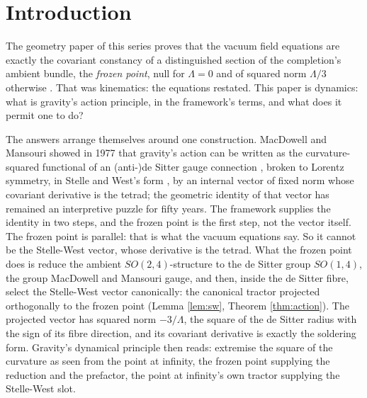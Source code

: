\documentclass[11pt]{article}
\theoremstyle{definition}
\begin{document}
\newpage
\section{Introduction}\label{sec:intro}

The geometry paper of this series proves that the vacuum field equations are exactly the covariant constancy of a distinguished section of the completion's ambient bundle, the \emph{frozen point}, null for $\Lambda = 0$ and of squared norm $\Lambda/3$ otherwise \cite{ButlerT6}. That was kinematics: the equations restated. This paper is dynamics: what is gravity's action principle, in the framework's terms, and what does it permit one to do?

The answers arrange themselves around one construction. MacDowell and Mansouri showed in 1977 that gravity's action can be written as the curvature-squared functional of an (anti-)de Sitter gauge connection \cite{MacDowellMansouri1977}, broken to Lorentz symmetry, in Stelle and West's form \cite{StelleWest1980}, by an internal vector of fixed norm whose covariant derivative is the tetrad; the geometric identity of that vector has remained an interpretive puzzle for fifty years. The framework supplies the identity in two steps, and the frozen point is the first step, not the vector itself. The frozen point is parallel: that is what the vacuum equations say. So it cannot be the Stelle-West vector, whose derivative is the tetrad. What the frozen point does is reduce the ambient $SO(2,4)$-structure to the de Sitter group $SO(1,4)$, the group MacDowell and Mansouri gauge, and then, inside the de Sitter fibre, select the Stelle-West vector canonically: the canonical tractor projected orthogonally to the frozen point (Lemma \ref{lem:sw}, Theorem \ref{thm:action}). The projected vector has squared norm $-3/\Lambda$, the square of the de Sitter radius with the sign of its fibre direction, and its covariant derivative is exactly the soldering form. Gravity's dynamical principle then reads: extremise the square of the curvature as seen from the point at infinity, the frozen point supplying the reduction and the prefactor, the point at infinity's own tractor supplying the Stelle-West slot.
\end{document}
